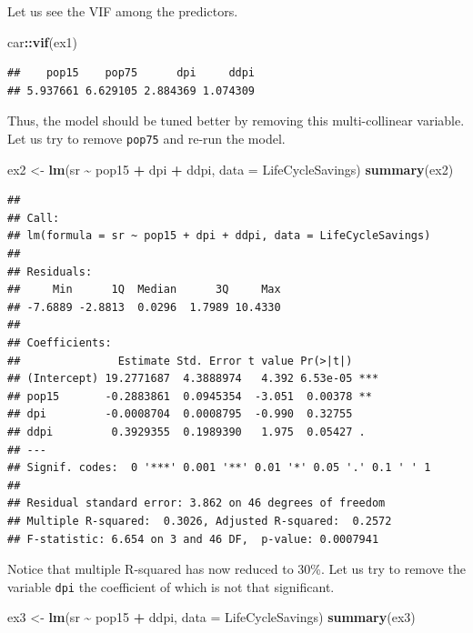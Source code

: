 \documentclass[
]{book}
\newenvironment{Shaded}{\begin{snugshade}}{\end{snugshade}}
\newcommand{\AttributeTok}[1]{\textcolor[rgb]{0.13,0.29,0.53}{#1}}
\newcommand{\FunctionTok}[1]{\textcolor[rgb]{0.13,0.29,0.53}{\textbf{#1}}}
\newcommand{\NormalTok}[1]{#1}
\newcommand{\OtherTok}[1]{\textcolor[rgb]{0.56,0.35,0.01}{#1}}
\newcommand{\SpecialCharTok}[1]{\textcolor[rgb]{0.81,0.36,0.00}{\textbf{#1}}}
\begin{document}
Let us see the VIF among the predictors.

\begin{Shaded}
\begin{Highlighting}[]
\NormalTok{car}\SpecialCharTok{::}\FunctionTok{vif}\NormalTok{(ex1)}
\end{Highlighting}
\end{Shaded}

\begin{verbatim}
##    pop15    pop75      dpi     ddpi 
## 5.937661 6.629105 2.884369 1.074309
\end{verbatim}

Thus, the model should be tuned better by removing this multi-collinear variable. Let us try to remove \texttt{pop75} and re-run the model.

\begin{Shaded}
\begin{Highlighting}[]
\NormalTok{ex2 }\OtherTok{\textless{}{-}} \FunctionTok{lm}\NormalTok{(sr }\SpecialCharTok{\textasciitilde{}}\NormalTok{ pop15 }\SpecialCharTok{+}\NormalTok{ dpi }\SpecialCharTok{+}\NormalTok{ ddpi, }\AttributeTok{data =}\NormalTok{ LifeCycleSavings)}
\FunctionTok{summary}\NormalTok{(ex2)}
\end{Highlighting}
\end{Shaded}

\begin{verbatim}
## 
## Call:
## lm(formula = sr ~ pop15 + dpi + ddpi, data = LifeCycleSavings)
## 
## Residuals:
##     Min      1Q  Median      3Q     Max 
## -7.6889 -2.8813  0.0296  1.7989 10.4330 
## 
## Coefficients:
##               Estimate Std. Error t value Pr(>|t|)    
## (Intercept) 19.2771687  4.3888974   4.392 6.53e-05 ***
## pop15       -0.2883861  0.0945354  -3.051  0.00378 ** 
## dpi         -0.0008704  0.0008795  -0.990  0.32755    
## ddpi         0.3929355  0.1989390   1.975  0.05427 .  
## ---
## Signif. codes:  0 '***' 0.001 '**' 0.01 '*' 0.05 '.' 0.1 ' ' 1
## 
## Residual standard error: 3.862 on 46 degrees of freedom
## Multiple R-squared:  0.3026, Adjusted R-squared:  0.2572 
## F-statistic: 6.654 on 3 and 46 DF,  p-value: 0.0007941
\end{verbatim}

Notice that multiple R-squared has now reduced to 30\%. Let us try to remove the variable \texttt{dpi} the coefficient of which is not that significant.

\begin{Shaded}
\begin{Highlighting}[]
\NormalTok{ex3 }\OtherTok{\textless{}{-}} \FunctionTok{lm}\NormalTok{(sr }\SpecialCharTok{\textasciitilde{}}\NormalTok{ pop15 }\SpecialCharTok{+}\NormalTok{ ddpi, }\AttributeTok{data =}\NormalTok{ LifeCycleSavings)}
\FunctionTok{summary}\NormalTok{(ex3)}
\end{Highlighting}
\end{Shaded}
\end{document}
